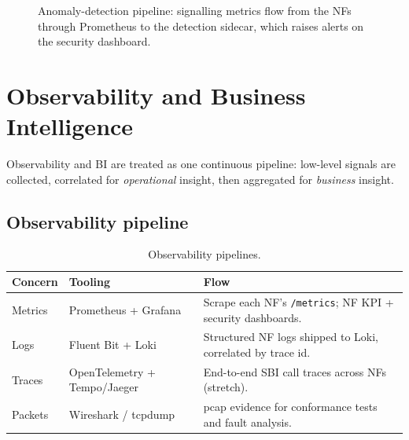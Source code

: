 \documentclass[11pt,a4paper]{report}
\newcommand{\code}[1]{\texttt{\small #1}}
\begin{document}
\begin{figure}[h]
\centering
{}
\caption{Anomaly-detection pipeline: signalling metrics flow from the NFs through Prometheus
to the detection sidecar, which raises alerts on the security dashboard.}
\label{fig:anomaly-pipe}
\end{figure}

\section{Observability and Business Intelligence}
\label{sec:observability}
Observability and BI are treated as one continuous pipeline: low-level signals are
collected, correlated for \emph{operational} insight, then aggregated for \emph{business}
insight.

\subsection{Observability pipeline}
\begin{table}[h]
\centering
\renewcommand{\arraystretch}{1.2}
\begin{tabularx}{\linewidth}{@{}l l X@{}}
\toprule
\textbf{Concern} & \textbf{Tooling} & \textbf{Flow}\\
\midrule
Metrics & Prometheus + Grafana & Scrape each NF's \code{/metrics}; NF KPI + security dashboards.\\
Logs    & Fluent Bit + Loki    & Structured NF logs shipped to Loki, correlated by trace id.\\
Traces  & OpenTelemetry + Tempo/Jaeger & End-to-end SBI call traces across NFs (stretch).\\
Packets & Wireshark / tcpdump  & pcap evidence for conformance tests and fault analysis.\\
\bottomrule
\end{tabularx}
\caption{Observability pipelines.}
\label{tab:obs}
\end{table}
\end{document}
